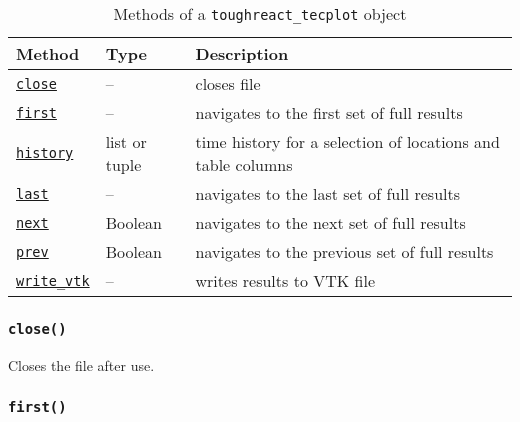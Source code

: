 \begin{table}
  \begin{center}
    \begin{tabular}{|l|l|p{90mm}|}
      \hline
      \textbf{Method} & \textbf{Type} & \textbf{Description}\\
      \hline
      \hyperref[sec:toughreact_tecplot:close]{\texttt{close}} & -- & closes file\\
      \hyperref[sec:toughreact_tecplot:first]{\texttt{first}} & -- & navigates to the first set of full results\\
      \hyperref[sec:toughreact_tecplot:history]{\texttt{history}} & list or tuple & time history for a selection of locations and table columns\\
      \hyperref[sec:toughreact_tecplot:last]{\texttt{last}} & -- & navigates to the last set of full results\\
      \hyperref[sec:toughreact_tecplot:next]{\texttt{next}} & Boolean & navigates to the next set of full results\\
      \hyperref[sec:toughreact_tecplot:prev]{\texttt{prev}} & Boolean & navigates to the previous set of full results\\
      \hyperref[sec:toughreact_tecplot:write_vtk]{\texttt{write\_vtk}} & -- & writes results to VTK file\\
      \hline
    \end{tabular}
    \caption{Methods of a \texttt{toughreact\_tecplot} object}
    \label{tb:toughreact_tecplot_methods}
  \end{center}
\end{table}

\begin{snugshade}
\subsubsection{\texttt{close()}}
\end{snugshade}
\label{sec:toughreact_tecplot:close}

Closes the file after use.

\begin{snugshade}
\subsubsection{\texttt{first()}}
\end{snugshade}
\label{sec:toughreact_tecplot:first}

